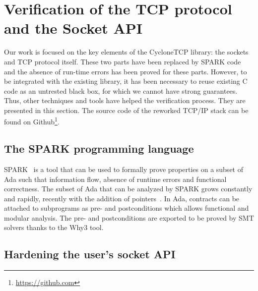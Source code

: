 \documentclass[runningheads]{llncs}
\begin{document}
\section{Verification of the TCP protocol and the Socket API}

    Our work is focused on the key elements of the CycloneTCP library: the sockets and TCP protocol itself.
    These two parts have been replaced by SPARK code and the absence of run-time errors has been proved for
    these parts.
    However, to be integrated with the existing library, it has been necessary to reuse existing C code
    as an untrested black box, for which we cannot have strong guarantees. Thus, other techniques
    and tools have helped the verification process. They are presented in this section.
    The source code of the reworked TCP/IP stack can be found on Github\footnote{\url{https://github.com}}.

\subsection{The SPARK programming language}

    SPARK~\cite{mccormick2015building} is a tool that can be used to formally prove properties on a subset of Ada such that
    information flow, absence of runtime errors and functional correctness. The subset of Ada that can be analyzed by SPARK
    grows constantly and rapidly, recently with the addition of pointers~\cite{dross2020recursive}.
    In Ada, contracts can be attached to subprograms as pre- and postconditions which allows functional and modular analysis.
    The pre- and postconditions are exported to be proved by SMT solvers thanks to the Why3 tool.

\subsection{Hardening the user's socket API}
\end{document}
